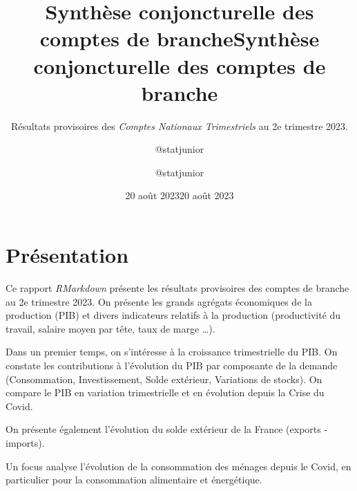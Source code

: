\documentclass[
  paper=a4,
  ,captions=tableheading
]{scrartcl}
\title{Synthèse conjoncturelle des comptes de branche}
\subtitle{Résultats provisoires des \emph{Comptes Nationaux
Trimestriels} au 2e trimestre 2023.}
\author{@statjunior}
\date{20 août 2023}
\title{Synthèse conjoncturelle des comptes de branche}
\author{@statjunior}
\date{20 août 2023}
\begin{document}
\begin{titlepage}
\afterpage{\restorepagecolor}
\newcommand{\colorRule}[3][black]{\textcolor[HTML]{#1}{\rule{#2}{#3}}}
\end{titlepage}
\restoregeometry
{} 




\hypertarget{pruxe9sentation}{%
\section{Présentation}\label{pruxe9sentation}}

Ce rapport \emph{RMarkdown} présente les résultats provisoires des
comptes de branche au 2e trimestre 2023. On présente les grands agrégats
économiques de la production (PIB) et divers indicateurs relatifs à la
production (productivité du travail, salaire moyen par tête, taux de
marge \ldots).

Dans un premier temps, on s'intéresse à la croissance trimestrielle du
PIB. On constate les contributions à l'évolution du PIB par composante
de la demande (Consommation, Investissement, Solde extérieur, Variations
de stocks). On compare le PIB en variation trimestrielle et en évolution
depuis la Crise du Covid.

On présente également l'évolution du solde extérieur de la France
(exports - imports).

Un focus analyse l'évolution de la consommation des ménages depuis le
Covid, en particulier pour la consommation alimentaire et énergétique.
\end{document}
